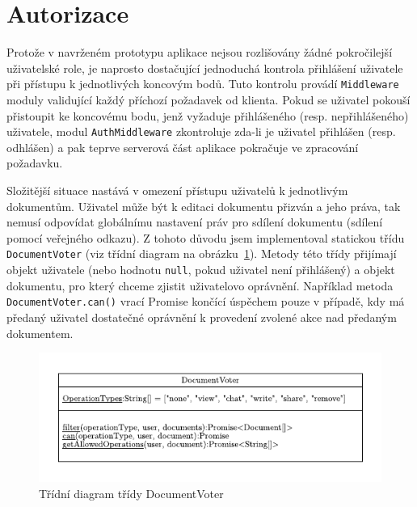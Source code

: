 
\section{Autorizace}\label{sec:autorizace}

Protože v navrženém prototypu aplikace nejsou rozlišovány žádné pokročilejší uživatelské role, je naprosto dostačující jednoduchá kontrola přihlášení uživatele při přístupu k jednotlivých koncovým bodů.
Tuto kontrolu provádí \texttt{Middleware} moduly validující každý příchozí požadavek od klienta.
Pokud se uživatel pokouší přistoupit ke koncovému bodu, jenž vyžaduje přihlášeného (resp. nepřihlášeného) uživatele, modul \texttt{AuthMiddleware} zkontroluje zda-li je uživatel přihlášen (resp. odhlášen) a pak teprve serverová část aplikace pokračuje ve zpracování požadavku.

Složitější situace nastává v omezení přístupu uživatelů k jednotlivým dokumentům.
Uživatel může být k editaci dokumentu přizván a jeho práva, tak nemusí odpovídat globálnímu nastavení práv pro sdílení dokumentu (sdílení pomocí veřejného odkazu).
Z tohoto důvodu jsem implementoval statickou třídu \texttt{DocumentVoter} (viz třídní diagram na obrázku~\ref{fig:DocumentVoter}).
Metody této třídy přijímají objekt uživatele (nebo hodnotu \texttt{null}, pokud uživatel není přihlášený) a objekt dokumentu, pro který chceme zjistit uživatelovo oprávnění.
Například metoda \texttt{DocumentVoter.can()} vrací Promise končící úspěchem pouze v případě, kdy má předaný uživatel dostatečné oprávnění k provedení zvolené akce nad předaným dokumentem.

\begin{figure}[ht!]
    \centering
    \includegraphics[width=\textwidth]{partials/realizace/DocumentVoter.pdf}
    \caption{Třídní diagram třídy DocumentVoter}\label{fig:DocumentVoter}
\end{figure}

